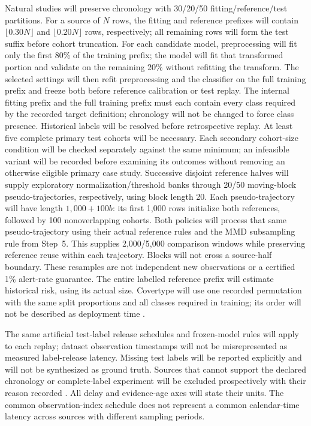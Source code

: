 \documentclass[11pt,a4paper]{article}
\begin{document}
Natural studies will preserve chronology with 30/20/50 fitting/reference/test
partitions. For a source of $N$ rows, the fitting and reference prefixes will
contain $\lfloor0.30N\rfloor$ and $\lfloor0.20N\rfloor$ rows, respectively;
all remaining rows will form the test suffix before cohort truncation.
For each candidate model, preprocessing will fit only the first 80\% of the
training prefix; the model will fit that transformed portion and validate on
the remaining 20\% without refitting the transform. The selected settings
will then refit preprocessing and the classifier on the full training prefix
and freeze both before reference calibration or test replay. The internal
fitting prefix and the full training prefix must each contain every class
required by the recorded target definition; chronology will not be changed to
force class presence. Historical labels will be resolved before retrospective
replay. At least five complete primary test cohorts will be necessary. Each secondary
cohort-size condition will be checked separately against the same minimum;
an infeasible variant will be recorded before examining its outcomes without
removing an otherwise eligible primary case study. Successive disjoint
reference halves will supply exploratory normalization/threshold banks through
20/50 moving-block pseudo-trajectories, respectively, using block length 20.
Each pseudo-trajectory will have length $1{,}000+100b$: its first 1,000 rows
initialize both references, followed by 100 nonoverlapping cohorts. Both
policies will process that same pseudo-trajectory using their actual reference
rules and the MMD subsampling rule from Step~5. This supplies 2,000/5,000
comparison windows while preserving reference reuse within each trajectory.
Blocks will not cross a source-half boundary. These resamples are not
independent new observations or a certified 1\% alert-rate guarantee.
The entire labelled reference prefix will
estimate historical risk, using its actual size. Covertype will use one recorded
permutation with the same split proportions and all classes required in training;
its order will not be described as deployment time \cite{souza,kunsch}.

The same artificial test-label release schedules and frozen-model rules will
apply to each replay; dataset observation timestamps will not be
misrepresented as measured label-release latency. Missing test labels will be
reported explicitly and will not be synthesized as ground truth. Sources that
cannot support the declared chronology or complete-label experiment will be
excluded prospectively with their reason recorded \cite{souza,alencar}.
All delay and evidence-age axes will state their units. The common
observation-index schedule does not represent a common calendar-time latency
across sources with different sampling periods.
\end{document}
